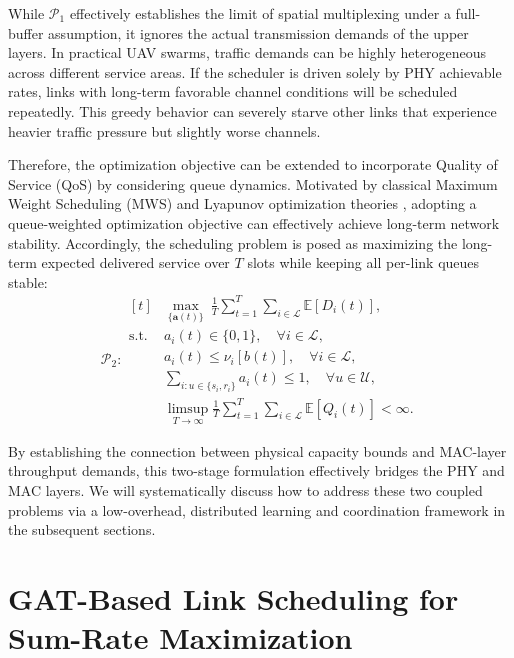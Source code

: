 \documentclass[letterpaper,journal]{IEEEtran}
\begin{document}
	While $\mathcal{P}_1$ effectively establishes the limit of spatial multiplexing under a full-buffer assumption, it ignores the actual transmission demands of the upper layers. In practical UAV swarms, traffic demands can be highly heterogeneous across different service areas. If the scheduler is driven solely by PHY achievable rates, links with long-term favorable channel conditions will be scheduled repeatedly. This greedy behavior can severely starve other links that experience heavier traffic pressure but slightly worse channels. 
	
	Therefore, the optimization objective can be extended to incorporate Quality of Service (QoS) by considering queue dynamics. Motivated by classical Maximum Weight Scheduling (MWS) and Lyapunov optimization theories \cite{TassiulasEphremides1992}, adopting a queue-weighted optimization objective can effectively achieve long-term network stability. Accordingly, the scheduling problem is posed as maximizing the long-term expected delivered service over $T$ slots while keeping all per-link queues stable\cite{mab}:
	\begin{equation}
		\mathcal{P}_2:
		\begin{aligned}[t]
			& \max_{\{\mathbf{a}(t)\}} \ \frac{1}{T} \sum_{t=1}^{T} \sum_{i \in \mathcal{L}} \mathbb{E}[D_i(t)], \\
			\text{s.t.} \ & a_i(t) \in \{0, 1\}, \quad \forall i \in \mathcal{L}, \\
			& a_i(t) \leq \nu_i[b(t)], \quad \forall i \in \mathcal{L}, \\
			& \sum_{i: u \in \{s_i, r_i\}} a_i(t) \leq 1, \quad \forall u \in \mathcal{U}, \\
			& \limsup_{T \to \infty} \frac{1}{T} \sum_{t=1}^{T} \sum_{i \in \mathcal{L}} \mathbb{E}[Q_i(t)] < \infty.
		\end{aligned}
		\label{prob:queue_weighted}
	\end{equation}
	
	By establishing the connection between physical capacity bounds and MAC-layer throughput demands, this two-stage formulation effectively bridges the PHY and MAC layers. We will systematically discuss how to address these two coupled problems via a low-overhead, distributed learning and coordination framework in the subsequent sections.
	
	\section{GAT-Based Link Scheduling for Sum-Rate Maximization}
	\label{sec:gat_scheduler}
	
\end{document}

